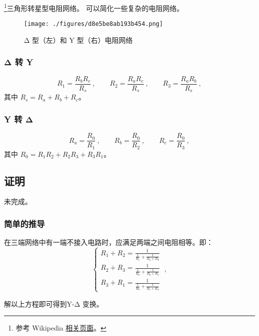 
\begin{issues}
\issueDraft
\end{issues}

\footnote{参考 Wikipedia \href{https://en.wikipedia.org/wiki/Y-Δ_transform}{相关页面}。}三角形转星型电阻网络。 可以简化一些复杂的电阻网络。

\begin{figure}[ht]
\centering
\texttt{[image: ./figures/d8e5be8ab193b454.png]}
\caption{Δ 型（左）和 Y 型（右）电阻网络} \label{fig_Tri2St_1}
\end{figure}

\subsubsection{Δ 转 Y}
\begin{equation}
R_1 = \frac{R_b R_c}{R_s} ~,\qquad
R_2 = \frac{R_a R_c}{R_s} ~,\qquad
R_3 = \frac{R_a R_b}{R_s}~,
\end{equation}
其中 $R_s = R_a + R_b + R_c$。

\subsubsection{Y 转 Δ}
\begin{equation}
R_a = \frac{R_0}{R_1}~, \qquad
R_b = \frac{R_0}{R_2} ~,\qquad
R_c = \frac{R_0}{R_3}~,
\end{equation}
其中 $R_0 = R_1 R_2 + R_2 R_3 + R_3 R_1$。

\subsection{证明}
未完成。
\subsubsection{简单的推导}
在三端网络中有一端不接入电路时，应满足两端之间电阻相等。即：
\begin{equation}
\left\{\begin{matrix}R_1+R_2=\frac{1}{\frac{1}{R_c}+\frac{1}{R_a+R_b}}\\R_2+R_3=\frac{1}{\frac{1}{R_a}+\frac{1}{R_b+R_c}}\\R_3+R_1=\frac{1}{\frac{1}{R_b}+\frac{1}{R_c+R_a}}\end{matrix}\right.~,
\end{equation}

解以上方程即可得到Y-Δ 变换。
